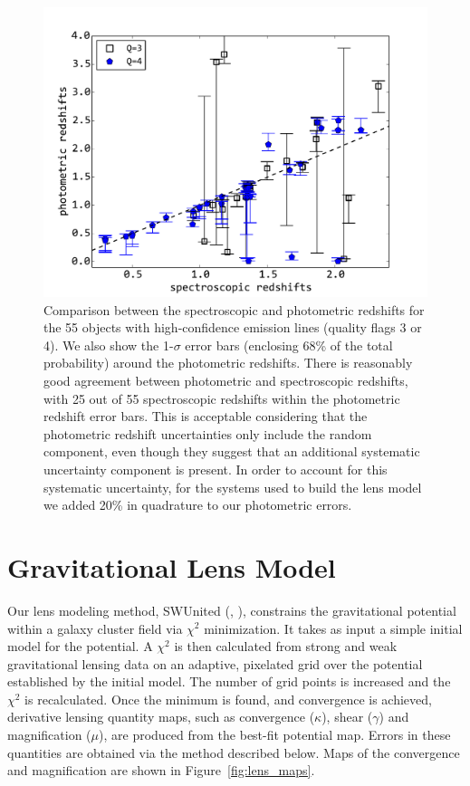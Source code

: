 \begin{figure}
    \centering
    \includegraphics[width=\textwidth]{fig/a2744_ELobjs_photz_vs_specz.pdf}
    \caption[Comparison between the spectroscopic and photometric redshifts.]{Comparison between the spectroscopic and photometric redshifts for the 55 objects with
    high-confidence emission lines (quality flags 3 or 4).  We also show the 1-$\sigma$ error bars (enclosing
    68\% of the total probability) around the photometric redshifts. There is reasonably good agreement between
    photometric and spectroscopic redshifts, with 25 out of 55 spectroscopic redshifts within the photometric
    redshift error bars. This is acceptable considering that the photometric redshift uncertainties only include
    the random component, even though they suggest that an additional systematic uncertainty component is
    present. In order to account for this systematic uncertainty, for the systems used to build the lens model we
    added 20\% in quadrature to our photometric errors.  \label{fig:ELobjs_photz}}
\end{figure}

\section{Gravitational Lens Model}
\label{sec:mass}

Our lens modeling method, SWUnited (\citealp{bradac09},
\citealp{bradac05}), constrains the gravitational potential within a
galaxy cluster field via $\chi^2$ minimization. It takes as input a
simple initial model for the potential. A $\chi^2$ is then calculated
from strong and weak gravitational lensing data on an adaptive,
pixelated grid over the potential established by the initial
model. The number of grid points is increased and the $\chi^2$ is
recalculated. Once the minimum is found, and convergence is achieved,
derivative lensing quantity maps, such as convergence ($\kappa$),
shear ($\gamma$) and magnification ($\mu$), are produced from the
best-fit potential map. Errors in these quantities are obtained via the method described below.
Maps of the convergence and magnification
are shown in Figure~\ref{fig:lens_maps}.

